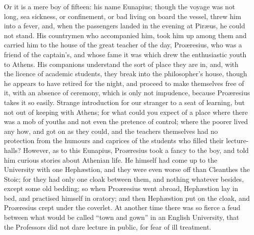 Or it is a mere boy of fifteen: his name Eunapius; though the
voyage was not long, sea sickness, or confinement, or bad living on
board the vessel, threw him into a fever, and, when the passengers
landed in the evening at Piræus, he could not stand. His countrymen
who accompanied him, took him up among them and carried him to the
house of the great teacher of the day, Proæresius, who was a friend
of the captain's, and whose fame it was which drew the enthusiastic
youth to Athens. His companions understand the sort of place they are
in, and, with the licence of academic students, they break into the
philosopher's house, though he appears to have retired for the night,
and proceed to make themselves free of it, with an absence of
ceremony, which is only not impudence, because Proæresius takes it so
easily. Strange introduction for our stranger to a seat of learning,
but not out of keeping with Athens; for what could you expect of a
place where there was a mob of youths and not even the pretence of
control; where the poorer lived any how, and got on as they could, and
the teachers themselves had no protection from the humours and
caprices of the students who filled their lecture-halls? However, as
to this Eunapius, Proæresius took a fancy to the boy, and told him
curious stories about Athenian life. He himself had come up to the
University with one Hephæstion, and they were even worse off than
Cleanthes the Stoic; for they had only one cloak between them, and
nothing whatever besides, except some old bedding; so when Proæresius
went abroad, Hephæstion lay in bed, and practised himself in oratory;
and then Hephæstion put on the cloak, and Proæresius crept under the
coverlet. At another time there was so fierce a feud between what
would be called ``town and gown'' in an English University,
that the Professors did not dare lecture in public, for fear of ill
treatment.

